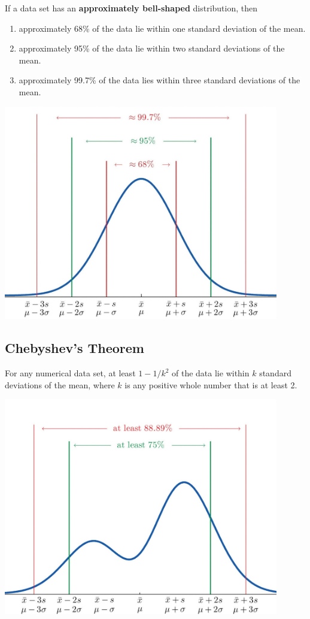 If a data set has an \textbf{approximately bell-shaped} distribution, then
\begin{enumerate}[sepno]
\item
  approximately 68\% of the data lie within one standard deviation of
  the mean.
\item
  approximately 95\% of the data lie within two standard deviations of
  the mean.
\item
  approximately 99.7\% of the data lies within three standard deviations
  of the mean.
\end{enumerate}
\begin{center}
  \includegraphics[width=0.9\textwidth]{Figures/Empirical-Rule.jpg}
\end{center}

\hypertarget{chebyshevs-theorem}{%
\subsection{Chebyshev's Theorem}\label{chebyshevs-theorem}}

For any numerical data set, at least \(1-1/k^2\) of the data lie within
\(k\) standard deviations of the mean, where \(k\) is any positive whole
number that is at least 2.
\begin{center}
  \includegraphics[width=0.9\textwidth]{Figures/Chebyshev.jpg}
\end{center}


